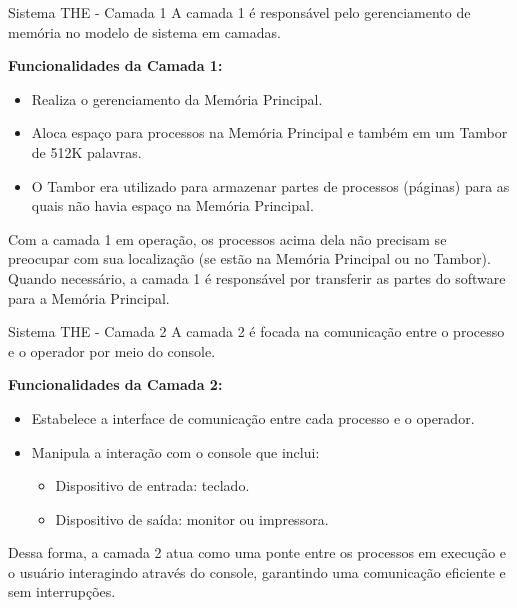 \documentclass{beamer}
\begin{document}
\begin{frame}{Sistema THE -  Camada 1}
    A camada 1 é responsável pelo gerenciamento de memória no modelo de sistema em camadas.

    \vspace{0.5cm}

    \textbf{Funcionalidades da Camada 1:}
    \begin{itemize}
        \item Realiza o gerenciamento da Memória Principal.
        \item Aloca espaço para processos na Memória Principal e também em um Tambor de 512K palavras.
        \item O Tambor era utilizado para armazenar partes de processos (páginas) para as quais não havia espaço na Memória Principal.
    \end{itemize}

    \vspace{0.5cm}

    Com a camada 1 em operação, os processos acima dela não precisam se preocupar com sua localização (se estão na Memória Principal ou no Tambor). Quando necessário, a camada 1 é responsável por transferir as partes do software para a Memória Principal.
\end{frame}

\begin{frame}{Sistema THE -  Camada 2}
    A camada 2 é focada na comunicação entre o processo e o operador por meio do console.

    \vspace{0.5cm}

    \textbf{Funcionalidades da Camada 2:}
    \begin{itemize}
        \item Estabelece a interface de comunicação entre cada processo e o operador.
        \item Manipula a interação com o console que inclui:
              \begin{itemize}
                  \item Dispositivo de entrada: teclado.
                  \item Dispositivo de saída: monitor ou impressora.
              \end{itemize}
    \end{itemize}

    \vspace{0.5cm}

    Dessa forma, a camada 2 atua como uma ponte entre os processos em execução e o usuário interagindo através do console, garantindo uma comunicação eficiente e sem interrupções.
\end{frame}
\end{document}
